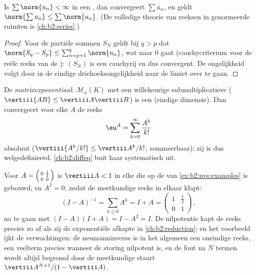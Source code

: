 \begin{theorem}\label{thm:b2:nvs:absoluteconvergence}
Is $\sum \norm{u_n} < \infty$ in een , dan convergeert
$\sum u_n$, en geldt $\norm{\sum u_n} \leq \sum\norm{u_n}$. (De
volledige theorie van reeksen in genormeerde ruimten is
\cref{ch:b2:series}.)
\end{theorem}

\begin{proof}
Voor de partiële sommen $S_N$ geldt bij $q > p$ dat $\norm{S_q -
S_p} \leq \sum_{n=p+1}^{q}\norm{u_n}$, wat naar $0$ gaat
(cauchycriterium voor de reële reeks van de ): $(S_N)$ is een
cauchyrij en dus convergent. De ongelijkheid volgt door in de
eindige driehoeksongelijkheid naar de limiet over te gaan.
\end{proof}

\begin{example}\label{ex:b2:nvs:matrixexp}
De \emph{matrixexponentiaal}:
$\mathcal{M}_n(K)$ met een willekeurige submultiplicatieve 
($\vertiii{AB} \leq \vertiii A \vertiii B$) is een 
(eindige dimensie). Dan convergeert voor elke $A$ de reeks
\[
\eu^A = \sum_{k=0}^{\infty} \frac{A^k}{k!}
\]
absoluut ($\vertiii{A^k/k!} \leq \vertiii A^k /k!$, sommeerbaar):
zij is dus welgedefinieerd. \cref{ch:b2:diffeq} buit haar
systematisch uit.
\end{example}

\begin{example}\label{ex:b2:nvs:neumannfinite}
Voor $A = \begin{psmallmatrix}0 & \frac12\\ 0 &
0\end{psmallmatrix}$ is $\vertiii A < 1$ in elke  die
op de  van \cref{ex:b2:nvs:examples} is gebouwd, en $A^2 =
0$, zodat de meetkundige reeks in elkaar klapt:
\[
(I - A)^{-1} = \sum_{k \geq 0} A^k = I + A =
\begin{pmatrix}1 & \tfrac12\\ 0 & 1\end{pmatrix},
\]
na te gaan met $(I - A)(I + A) = I - A^2 = I$. De nilpotentie kapt
de reeks precies zo af als zij de exponentiële afkapte in
\cref{ch:b2:reduction}; en het voorbeeld ijkt de verwachtingen: de
neumanninverse is in het algemeen een oneindige reeks, een
veelterm precies wanneer de storing nilpotent is, en de fout na $N$
termen wordt altijd begrensd door de meetkundige staart $\vertiii
A^{N+1}/(1 - \vertiii A)$.
\end{example}

